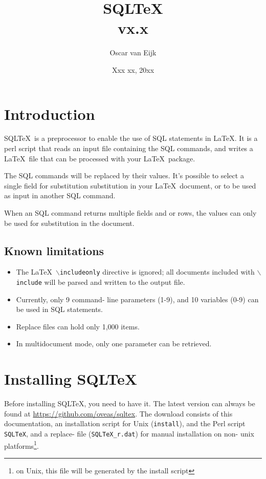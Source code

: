 \documentclass{article}
\newcommand{\bs}{\ensuremath{\backslash}}
\begin{document}
\title{SQL\TeX\\vx.x}
\date{Xxx xx, 20xx}
\author{Oscar van Eijk}
\maketitle
\hrulefill
\tableofcontents
\hrulefill

\section{Introduction}

SQL\TeX\ is a preprocessor to enable the use of SQL statements in \LaTeX. It is a perl script that reads
an input file containing the SQL commands, and writes a \LaTeX\ file that can be processed with your
\LaTeX\ package.

The SQL commands will be replaced by their values. It's possible to select a single field for substitution
substitution in your \LaTeX\ document, or to be used as input in another SQL command.

When an SQL command returns multiple fields and or rows, the values can only be used for substitution
in the document.

\subsection{Known limitations}

\begin{itemize}
\item The \LaTeX\ \texttt{\bs includeonly} directive is ignored; all documents included with \texttt{\bs include} will be parsed and written to the output file.
\item Currently, only 9 command- line parameters (1-9), and 10 variables (0-9) can be used in SQL statements.
\item Replace files can hold only 1,000 items.
\item In multidocument mode, only one parameter can be retrieved.
\end{itemize}

\section{Installing SQL\TeX}

Before installing SQL\TeX, you need to have it. The latest version can always be found at
\url{https://github.com/oveas/sqltex}.
The download consists of this do\-cumentation, an installation script for Unix
(\texttt{install}), and the Perl script \texttt{SQLTeX}, and a replace- file (\texttt{SQLTeX\_r.dat}) for manual installation
on non- unix platforms\footnote{on Unix, this file will be generated by the install script}.
\end{document}
